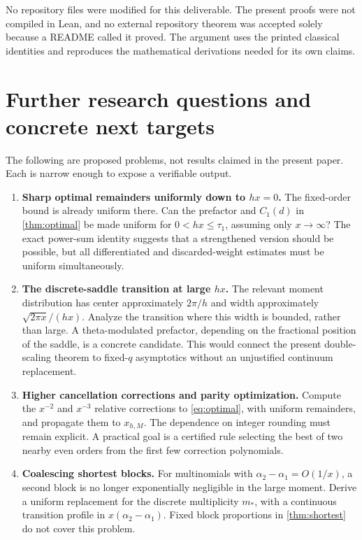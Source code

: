 \documentclass[11pt,a4paper]{article}
\numberwithin{equation}{section}
\theoremstyle{plain}
\theoremstyle{definition}
\theoremstyle{remark}
\begin{document}
No repository files were modified for this deliverable. The present proofs
were not compiled in Lean, and no external repository theorem was accepted
solely because a README called it proved. The argument uses the printed
classical identities and reproduces the mathematical derivations needed for
its own claims.

\section{Further research questions and concrete next targets}
\label{sec:future}

The following are proposed problems, not results claimed in the present
paper. Each is narrow enough to expose a verifiable output.

\begin{enumerate}[label=\textbf{Q\arabic*.},leftmargin=13mm]
\item \textbf{Sharp optimal remainders uniformly down to $hx=0$.}
The fixed-order bound is already uniform there. Can the prefactor and
$C_1(d)$ in \cref{thm:optimal} be made uniform for $0<hx\le\tau_1$, assuming
only $x\to\infty$? The exact power-sum identity suggests that a strengthened
version should be possible, but all differentiated and discarded-weight
estimates must be uniform simultaneously.

\item \textbf{The discrete-saddle transition at large $hx$.}
The relevant moment distribution has center approximately $2\pi/h$ and
width approximately $\sqrt{2\pi x}/(hx)$. Analyze the transition where this
width is bounded, rather than large. A theta-modulated prefactor, depending
on the fractional position of the saddle, is a concrete candidate. This
would connect the present double-scaling theorem to fixed-$q$ asymptotics
without an unjustified continuum replacement.

\item \textbf{Higher cancellation corrections and parity optimization.}
Compute the $x^{-2}$ and $x^{-3}$ relative corrections to \eqref{eq:optimal},
with uniform remainders, and propagate them to $x_{h,M}$. The dependence on
integer rounding must remain explicit. A practical goal is a certified rule
selecting the best of two nearby even orders from the first few correction
polynomials.

\item \textbf{Coalescing shortest blocks.}
For multinomials with $\alpha_2-\alpha_1=O(1/x)$, a second block is no longer
exponentially negligible in the large moment. Derive a uniform replacement
for the discrete multiplicity $m_*$, with a continuous transition profile
in $x(\alpha_2-\alpha_1)$. Fixed block proportions in \cref{thm:shortest}
do not cover this problem.


\end{enumerate}
\end{document}
